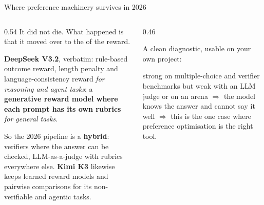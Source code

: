 \documentclass[aspectratio=169,10pt]{beamer}
\begin{document}
\begin{frame}{Where preference machinery survives in 2026}
  \begin{columns}[T]
    \begin{column}{0.54\textwidth}
      It did not die. What happened is that it moved over to the
       of the reward.
      \vspace{0.5em}

      \textbf{DeepSeek V3.2}, verbatim: rule-based outcome reward, length
      penalty and language-consistency reward \emph{for reasoning and agent
      tasks}; a \textbf{generative reward model where each prompt has its own
      rubrics} \emph{for general tasks}.
      \vspace{0.5em}

      So the 2026 pipeline is a \textbf{hybrid}: verifiers where the answer can
      be checked, LLM-as-a-judge with rubrics everywhere else.
      \textbf{Kimi K3} likewise keeps learned reward models and pairwise
      comparisons for its non-verifiable and agentic tasks.
    \end{column}
    \begin{column}{0.46\textwidth}
      \begin{takeaway}
        \small
        A clean diagnostic, usable on your own project:
        \vspace{0.3em}

        strong on multiple-choice and verifier benchmarks but weak with an
        LLM judge or on an arena $\Rightarrow$ the model knows the answer and
        cannot say it well $\Rightarrow$ this is the one case where preference
        optimisation is the right tool.
      \end{takeaway}
    \end{column}
  \end{columns}
\end{frame}
\end{document}
